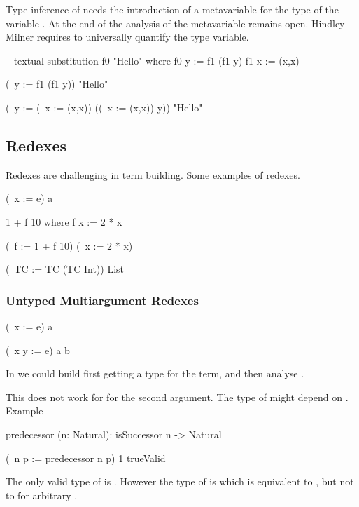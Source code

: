 Type inference of  needs the introduction of a metavariable
 for the type of the variable . At the end of the analysis
of  the metavariable remains open. Hindley-Milner requires to
universally quantify the type variable.

\begin{alba}
    -- textual substitution
    f0 "Hello" where
        f0 y := f1 (f1 y)
        f1 x := (x,x)

    (\ y := f1 (f1 y)) "Hello"

    (\ y := (\ x := (x,x)) ((\ x := (x,x)) y)) "Hello"
\end{alba}











\vskip 5mm
\subsection{Redexes}

Redexes are challenging in term building. Some examples of redexes.

\begin{alba}
    (\ x := e) a

    1 + f 10 where
        f x := 2 * x

    (\ f := 1 + f 10) (\ x := 2 * x)

    (\ TC := TC (TC Int)) List
\end{alba}
%





\subsubsection{Untyped Multiargument Redexes}

\begin{alba}
    (\ x := e) a

    (\ x y := e) a b
\end{alba}

In  we could build  first getting a type
 for the term, and then analyse .

This does not work for  for the second
argument. The type of  might depend on . Example
\begin{alba}
    predecessor (n: Natural): isSuccessor n -> Natural

    (\ n p := predecessor n p) 1 trueValid
\end{alba}
The only valid type of  is . However the type of
 is  which is equivalent to , but
not to  for arbitrary .

